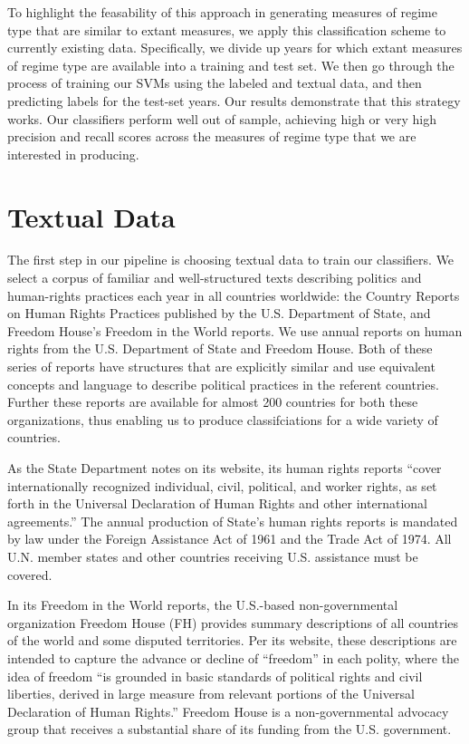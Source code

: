 \documentclass[pdftex,12pt,fullpage,oneside]{amsart}
\begin{document}
To highlight the feasability of this approach in generating measures of regime type that are similar to extant measures, we apply this classification scheme to currently existing data. Specifically, we divide up years for which extant measures of regime type are available into a training and test set. We then go through the process of training our SVMs using the labeled and textual data, and then predicting labels for the test-set years. Our results demonstrate that this strategy works. Our classifiers perform well out of sample, achieving high or very high precision and recall scores across the measures of regime type that we are interested in producing. 

\section{Textual Data}

The first step in our pipeline is choosing textual data to train our classifiers. We select a corpus of familiar and well-structured texts describing politics and human-rights practices each year in all countries worldwide: the Country Reports on Human Rights Practices published by the U.S. Department of State, and Freedom House's Freedom in the World reports. We use annual reports on human rights from the U.S. Department of State and Freedom House. Both of these series of reports have structures that are explicitly similar and use equivalent concepts and language to describe political practices in the referent countries. Further these reports are available for almost 200 countries for both these organizations, thus enabling us to produce classifciations for a wide variety of countries. 

As the State Department notes on its website, its human rights reports ``cover internationally recognized individual, civil, political, and worker rights, as set forth in the Universal Declaration of Human Rights and other international agreements.'' The annual production of State's human rights reports is mandated by law under the Foreign Assistance Act of 1961 and the Trade Act of 1974. All U.N. member states and other countries receiving U.S. assistance must be covered. 

In its Freedom in the World reports, the U.S.-based non-governmental organization Freedom House (FH) provides summary descriptions of all countries of the world and some disputed territories. Per its website, these descriptions are intended to capture the advance or decline of ``freedom'' in each polity, where the idea of freedom ``is grounded in basic standards of political rights and civil liberties, derived in large measure from relevant portions of the Universal Declaration of Human Rights.'' Freedom House is a non-governmental advocacy group that receives a substantial share of its funding from the U.S. government.
\end{document}
